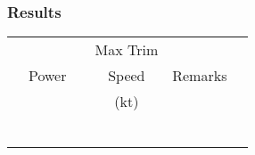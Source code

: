 % 
% 
%
\Large
\subsubsection*{Results}
  \settowidth{\colOne}{(USG)}
  \settowidth{\colTwo}{Power}
  \settowidth{\colThree}{Altitude}
  \settowidth{\colFive}{Remarks}

  \begin{tabularx}{\textwidth}{|c|c|c|c|lX|}
    \hline
\multirow{3}{\colOne}{\centering {Fuel (USG)}}&\multirow{3}{\colTwo}{Power}&\multirow{3}{\colThree}{\centering {Altitude (ft)}}&Max Trim&\multirow{3}{\colFive}{\centering Remarks}&\\
&&&Speed&&\\
&&&(kt)&&\\
    \hline
    \hline
    &&&&&\\
    \hline
    &&&&&\\
    \hline
    &&&&&\\
    \hline
    &&&&&\\
    \hline
    &&&&&\\
    \hline
    &&&&&\\
    \hline
    \end{tabularx}     
    \normalsize

   